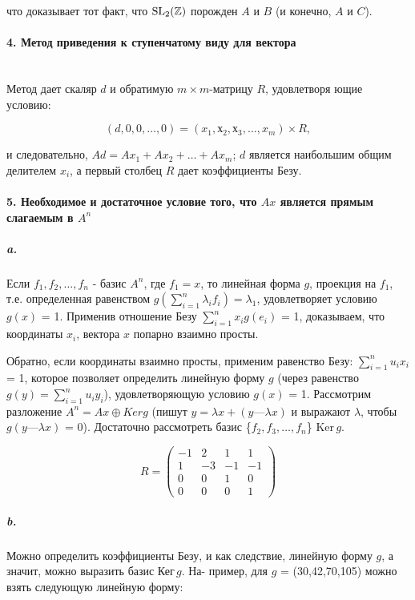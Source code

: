 \documentclass{mai_book}
\begin{document}
{\noindent что доказывает тот факт, что $\rm{SL_{2}}(\mathbb{Z})$ порожден $A$ и $B$ (и конечно, $A$ и $C$).

\paragraph{4. Метод приведения к ступенчатому виду для вектора} \mbox{}\\

Метод дает скаляр $d$ и обратимую $m \times m$-матрицу $R$, удовлетворя ющие условию:

\begin{equation*}
(d,0,0,\ldots,0) = (x_1,х_2,х_3,\ldots,x_m) \times R,
\end{equation*}

\noindent и следовательно, $Ad = Ax_1 + Ax_2 +\ldots+ Ax_{m}$; $d$ является наибольшим общим делителем $x_{i}$, а первый столбец $R$ дает коэффициенты Безу.

\paragraph{5. Необходимое и достаточное условие того, что $Ax$ является
\;\;\;прямым слагаемым в $A^{n}$}

\subparagraph{a.} Если $f_1,f_2,\ldots,f_n$ - базис $A^{n}$, где $f_1 = x$, то линейная форма $g$, проекция на $f_1$, т.е. определенная равенством $g(\sum_{i=1}^{n} \lambda_{i}f_{i}) = \lambda_{1}$, удовлетворяет условию $g(x)$ = 1. Применив отношение Безу $\sum_{i=1}^{n} x_{i}g(e_{i})$ = 1, доказываем, что координаты $x_i$, вектора $x$ попарно взаимно просты.

Обратно, если координаты взаимно просты, применим равенство Безу: $\sum_{i=1}^{n} u_{i}x_{i}$ = 1, которое позволяет определить линейную форму $g$ (через равенство $g(y) = \sum_{i=1}^{n} u_{i}y_{i}$), удовлетворяющую условию $g(x)$ = 1. Рассмотрим разложение $A^n = Ax \oplus Ker{g}$ (пишут $y = \lambda{x} + (y — \lambda{x})$ и выражают $\lambda$, чтобы $g(y — \lambda{x})$ = 0). Достаточно рассмотреть базис \{$f_2,f_3,\ldots,f_n$\} Ker\,{$g$}.

\begin{wrapfigure}{r}{5cm}
\begin{equation*}
R = \begin{pmatrix} -1 & 2 & 1 & 1 \\ 1 & -3 & -1 & -1 \\ 0 & 0 & 1 & 0 \\ 0 & 0 & 0 & 1 \end{pmatrix}
\end{equation*}
\end{wrapfigure}
\subparagraph{b.} Можно определить коэффициенты
Безу, и как следствие, линейную форму $g$,
а значит, можно выразить базис Кег\,{$g$}. На-
пример, для $g$ = (30,42,70,105) можно
взять следующую линейную форму:

}
\end{document}
